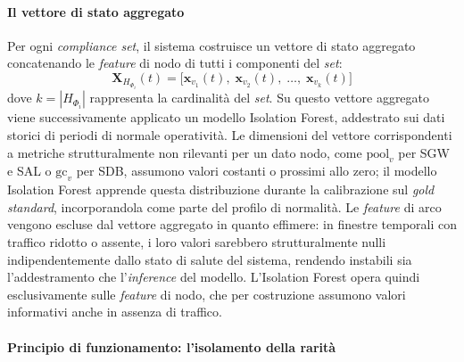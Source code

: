 \paragraph{Il vettore di stato aggregato}

Per ogni \textit{compliance set}, il sistema costruisce un vettore di stato aggregato concatenando
le \textit{feature} di nodo di tutti i componenti del \textit{set}:
\begin{equation}
\label{eq:aggregate_state}
\mathbf{X}_{H_{\Phi_i}}(t) = \bigl[\mathbf{x}_{v_1}(t),\; \mathbf{x}_{v_2}(t),\; \ldots,\; \mathbf{x}_{v_k}(t)\bigr]
\end{equation}
dove $k = |H_{\Phi_i}|$ rappresenta la cardinalità del \textit{set}. Su questo vettore aggregato
viene successivamente applicato un modello Isolation Forest, addestrato sui dati storici di periodi
di normale operatività. Le dimensioni del vettore corrispondenti a metriche strutturalmente non
rilevanti per un dato nodo, come $\text{pool}_v$ per SGW e SAL o $\text{gc}_v$ per SDB, assumono
valori costanti o prossimi allo zero; il modello Isolation Forest apprende questa distribuzione
durante la calibrazione sul \textit{gold standard}, incorporandola come parte del profilo di
normalità. Le \textit{feature} di arco vengono escluse dal vettore aggregato in quanto effimere:
in finestre temporali con traffico ridotto o assente, i loro valori sarebbero strutturalmente nulli
indipendentemente dallo stato di salute del sistema, rendendo instabili sia l'addestramento che
l'\textit{inference} del modello. L'Isolation Forest opera quindi esclusivamente sulle
\textit{feature} di nodo, che per costruzione assumono valori informativi anche in assenza di
traffico.

\paragraph{Principio di funzionamento: l'isolamento della rarità}

